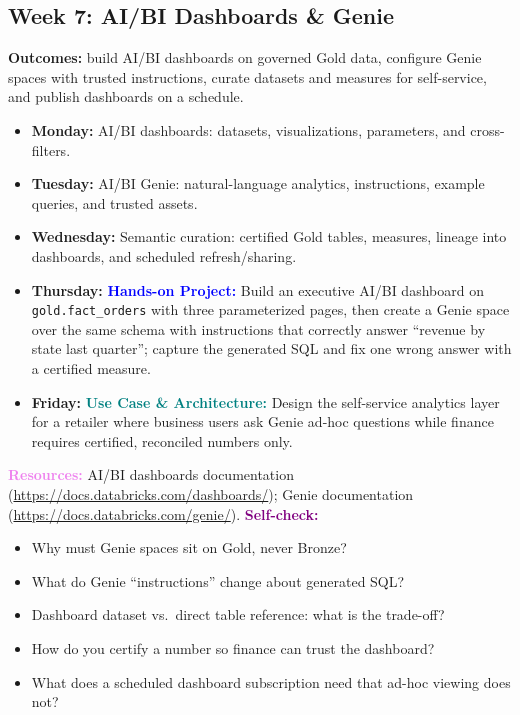\documentclass[11pt, a4paper]{article}
\newcommand{\project}[1]{\vspace{1mm}\noindent\textbf{\textcolor{blue}{Hands-on Project:}} #1}
\newcommand{\usecase}[1]{\vspace{1mm}\noindent\textbf{\textcolor{teal}{Use Case \& Architecture:}} #1}
\newcommand{\dayitem}[2]{\item \textbf{#1:} #2}
\newcommand{\resources}[1]{\vspace{1mm}\noindent\textbf{\textcolor{violet}{Resources:}} #1}
\newcommand{\selfcheck}[1]{\vspace{1mm}\noindent\textbf{\textcolor{purple}{Self-check:}} #1}
\begin{document}
\subsection*{Week 7: AI/BI Dashboards \& Genie}
\par\noindent\textbf{Outcomes:} build AI/BI dashboards on governed Gold data, configure Genie spaces with trusted instructions, curate datasets and measures for self-service, and publish dashboards on a schedule.
\begin{itemize}[label=-]
    \dayitem{Monday}{AI/BI dashboards: datasets, visualizations, parameters, and cross-filters.}
    \dayitem{Tuesday}{AI/BI Genie: natural-language analytics, instructions, example queries, and trusted assets.}
    \dayitem{Wednesday}{Semantic curation: certified Gold tables, measures, lineage into dashboards, and scheduled refresh/sharing.}
    \dayitem{Thursday}{\project{Build an executive AI/BI dashboard on \texttt{gold.fact\_orders} with three parameterized pages, then create a Genie space over the same schema with instructions that correctly answer ``revenue by state last quarter''; capture the generated SQL and fix one wrong answer with a certified measure.}}
    \dayitem{Friday}{\usecase{Design the self-service analytics layer for a retailer where business users ask Genie ad-hoc questions while finance requires certified, reconciled numbers only.}}
\end{itemize}
\resources{AI/BI dashboards documentation (\url{https://docs.databricks.com/dashboards/}); Genie documentation (\url{https://docs.databricks.com/genie/}).}
\selfcheck{\begin{itemize}[label=-, leftmargin=1.5em, itemsep=0pt]
    \item Why must Genie spaces sit on Gold, never Bronze?
    \item What do Genie ``instructions'' change about generated SQL?
    \item Dashboard dataset vs.\ direct table reference: what is the trade-off?
    \item How do you certify a number so finance can trust the dashboard?
    \item What does a scheduled dashboard subscription need that ad-hoc viewing does not?
\end{itemize}}
\end{document}
